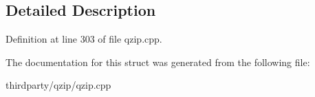 \subsection{Detailed Description}


Definition at line 303 of file qzip.\+cpp.



The documentation for this struct was generated from the following file\+:\begin{DoxyCompactItemize}
\item 
thirdparty/qzip/qzip.\+cpp\end{DoxyCompactItemize}
